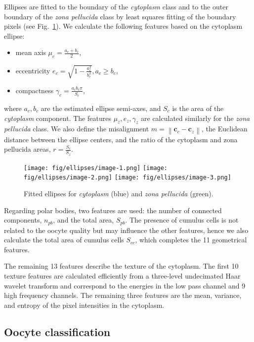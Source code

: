 \documentclass[]{spie}  %
\newcommand{\norm}[1]{\left\lVert#1\right\rVert}
\begin{document}
Ellipses are fitted to the boundary of the \textit{cytoplasm} class and to the outer
boundary of the \textit{zona pellucida} class by least squares fitting of the boundary pixels (see
Fig.~\ref{fig:ellipses}). We calculate the following features based on the
cytoplasm ellipse:
\begin{itemize}
\item {mean axis} $\mu_{c}=\frac{a_{c}+b_{c}}{2}$,
\item {eccentricity}
$e_{c}=\sqrt{1-\frac{a_{c}^2}{b_{c}^2}}, a_{c} \geq b_{c}$,
\item {compactness} $\gamma_{c}=\frac{a_{c}b_{c}\pi}{S_{c}}$,
\end{itemize}
where $a_{c}, b_{c}$ are the estimated ellipse semi-axes, and $S_{c}$ is the area of
the \textit{cytoplasm} component. The features $\mu_{z}, e_{z}, \gamma_{z}$ are
calculated similarly for the \textit{zona pellucida} class.  We also define the misalignment $m=\norm{\textbf{c}_{c}-\textbf{c}_{z}}$, the Euclidean distance
between the ellipse centers, and the ratio of the cytoplasm and zona pellucida
areas\cite{basile2010}, $r=\frac{S_{c}}{S_{z}}$.

\begin{figure}[tb]
\centering
\texttt{[image: fig/ellipses/image-1.png]}
\texttt{[image: fig/ellipses/image-2.png]}
\texttt{[image: fig/ellipses/image-3.png]}
\caption{Fitted ellipses for \textit{cytoplasm} (blue) and \textit{zona pellucida} (green).}
\label{fig:ellipses}
\end{figure}

Regarding polar bodies, two features are used: the number of connected
components, $n_{pb}$, and the total area, $S_{pb}$.  The presence of cumulus
cells is not related to the oocyte quality but may influence the other
features, hence we also calculate the total area of cumulus cells $S_{cc}$,
which completes the 11 geometrical features.

The remaining 13 features describe the texture of the cytoplasm\cite{manna2013}. The first 10 texture features are calculated
efficiently from a three-level undecimated Haar wavelet transform\cite{unser1995} and correspond to the energies
in the low pass channel and 9 high frequency channels. The
remaining three features are the mean, variance, and entropy of the
pixel intensities in the cytoplasm.

\subsection{Oocyte classification}
\label{sec:classification}
\end{document}

